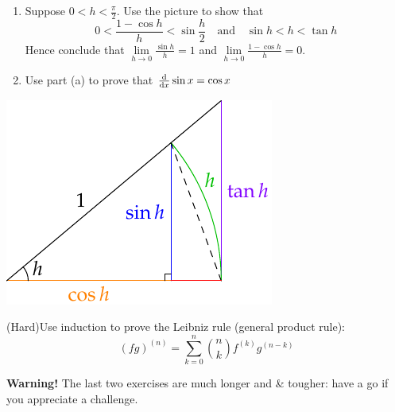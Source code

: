 \begin{exercises}{}
\begin{enumerate}
	
		\begin{minipage}[t]{0.63\linewidth}\vspace{0pt}
		  \item\label{ex:trigdiff}\begin{enumerate}
		    \item Suppose $0<h<\frac\pi 2$. Use the picture to show that
				\[
					0<\frac{1-\cos h}h< \sin\frac{h}2 
					\quad\text{and}\quad  
					\sin h< h<\tan h
				\]
				Hence conclude that $\lim\limits_{h\to 0}\frac{\sin h}h=1$ and $\lim\limits_{h\to 0}\frac{1-\cos h}h=0$.
			\item Use part (a) to prove that $\frac{\mathrm{d} }{\mathrm{d} x}\sin x=\cos x$
		\end{enumerate}
		\end{minipage}
		\hfill
		\begin{minipage}[t]{0.36\linewidth}\vspace{0pt}
	  	\flushright\includegraphics[scale=0.95]{trig-diff2}
	  \end{minipage}
	  
	
   	\item (Hard)\lstsp Use induction to prove the Leibniz rule (general product rule):
   	\[
   		(fg)^{(n)}=\sum_{k=0}^n\binom nk f^{(k)}g^{(n-k)}
   	\]
   
   	\goodbreak
   	
   	\item[]\textbf{Warning!} The last two exercises are much longer and \& tougher: have a go if you appreciate a challenge.
   	

\end{enumerate}
\end{exercises}
